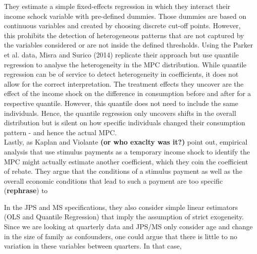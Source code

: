 They estimate a simple fixed-effects regression in which they interact their income schock variable with pre-defined dummies. Those dummies are based on continuous variables and created by choosing discrete cut-off points. However, this prohibits the detection of heterogeneous patterns that are not captured by the variables considered or are not inside the defined thresholds. Using the Parker et al. data, Misra and Surico (2014) replicate their approach but use quantile regression to analyse the heterogeneity in the MPC distribution. While quantile regression can be of service to detect heterogeneity in coefficients, it does not allow for the correct interpretation. The treatment effects they uncover are the effect of the income shock on the difference in consumption before and after for a respective quantile. However, this quantile does not need to include the same individuals. Hence, the quantile regression only uncovers shifts in the overall distribution but is silent on how specific individuals changed their consumption pattern - and hence the actual MPC. \\
Lastly, as Kaplan and Violante \textbf{(or who exaclty was it?)} point out, empirical analysis that use stimulus payments as a temporary income shock to identify the MPC might actually estimate another coefficient, which they coin the coefficient of rebate. They argue that the conditions of a stimulus payment as well as the overall economic conditions that lead to such a payment are too specific (\textbf{rephrase}) to 

In the JPS and MS specifications, they also consider simple linear estimators (OLS and Quantile Regression) that imply the assumption of strict exogeneity. Since we are looking at quarterly data and JPS/MS only consider age and change in the size of family as confounders, one could argue that there is little to no variation in these variables between quarters. In that case, 